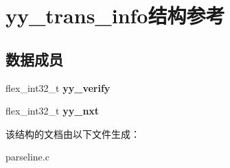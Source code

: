 \hypertarget{structyy__trans__info}{
\section{yy\_\-trans\_\-info结构参考}
\label{structyy__trans__info}
}
\subsection*{数据成员}
\begin{DoxyCompactItemize}
\item 
\hypertarget{structyy__trans__info_a5faf5583708f5fa457bc1cb9bab86e38}{
flex\_\-int32\_\-t {\bfseries yy\_\-verify}}
\label{structyy__trans__info_a5faf5583708f5fa457bc1cb9bab86e38}

\item 
\hypertarget{structyy__trans__info_a51bfd9e47041873b7b8075c677d1cfe1}{
flex\_\-int32\_\-t {\bfseries yy\_\-nxt}}
\label{structyy__trans__info_a51bfd9e47041873b7b8075c677d1cfe1}

\end{DoxyCompactItemize}


该结构的文档由以下文件生成：\begin{DoxyCompactItemize}
\item 
parseline.c\end{DoxyCompactItemize}
